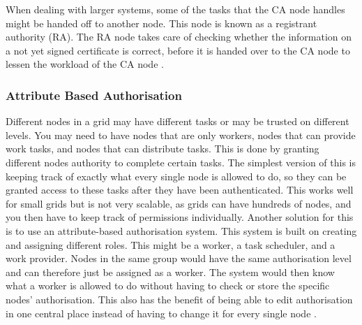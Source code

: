 When dealing with larger systems, some of the tasks that the CA node handles might be handed off to another node. This node is known as a registrant authority (RA). The RA node takes care of checking whether the information on a not yet signed certificate is correct, before it is handed over to the CA node to lessen the workload of the CA node \cite{IBM}.

\subsubsection{Attribute Based Authorisation}
Different nodes in a grid may have different tasks or may be trusted on different levels. You may need to have nodes that are only workers, nodes that can provide work tasks, and nodes that can distribute tasks. This is done by granting different nodes authority to complete certain tasks. The simplest version of this is keeping track of exactly what every single node is allowed to do, so they can be granted access to these tasks after they have been authenticated. This works well for small grids but is not very scalable, as grids can have hundreds of nodes, and you then have to keep track of permissions individually. Another solution for this is to use an attribute-based authorisation system. This system is built on creating and assigning different roles. This might be a worker, a task scheduler, and a work provider. Nodes in the same group would have the same authorisation level and can therefore just be assigned as a worker. The system would then know what a worker is allowed to do without having to check or store the specific nodes' authorisation. This also has the benefit of being able to edit authorisation in one central place instead of having to change it for every single node \cite{4144613}.
